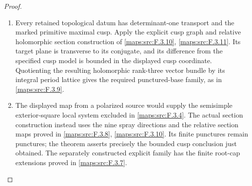 \documentclass[11pt,a4paper]{article}
\theoremstyle{definition}
\begin{document}
\begin{proof}
\begin{enumerate}[label=\arabic*.]
\item Every retained topological datum has determinant-one transport
and the marked primitive maximal cusp. Apply the explicit cusp graph
and relative holomorphic section construction of
\cref{maps:src:F.3.10}, \cref{maps:src:F.3.11}. Its target plane is transverse
to its conjugate, and its difference from the specified cusp model is
bounded in the displayed cusp coordinate. Quotienting the resulting
holomorphic rank-three vector bundle by its integral period lattice
gives the required punctured-base family, as in \cref{maps:src:F.3.9}.
\item The displayed map from a polarized source would supply the
semisimple exterior-square local system excluded in
\cref{maps:src:F.3.4}. The actual section construction instead uses
the nine spray directions and the relative section maps proved in
\cref{maps:src:F.3.8}, \cref{maps:src:F.3.10}. Its finite punctures remain
punctures; the theorem asserts precisely the bounded cusp conclusion
just obtained. The separately constructed explicit family has the
finite root-cap extensions proved in \cref{maps:src:F.3.7}.
\end{enumerate}
\end{proof}
\end{document}
